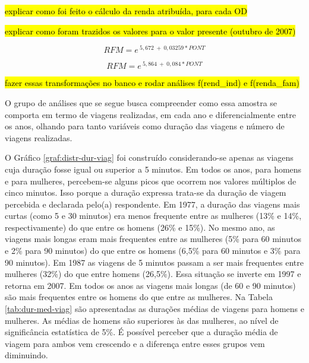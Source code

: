 \hl{explicar como foi feito o cálculo da renda atribuída, para cada OD}

\hl{explicar como foram trazidos os valores para o valor presente (outubro de 2007)}

\begin{equation}\label{eq:reg-renda-1997}
RFM = e^{~5,672~+~0,03259*PONT}
\end{equation}

\begin{equation}\label{eq:reg-renda-2007}
RFM = e^{~5,864~+~0,084*PONT}
\end{equation}

\hl{fazer essas transformações no banco e rodar análises f(rend\_ind) e f(renda\_fam)}

\clearpage
O grupo de análises que se segue busca compreender como essa amostra se comporta em termo de viagens realizadas, em cada ano e diferencialmente entre os anos, olhando para tanto variáveis como duração das viagens e número de viagens realizadas.


O Gráfico \ref{graf:distr-dur-viag} foi construído considerando-se apenas as viagens cuja duração fosse igual ou superior a 5 minutos. Em todos os anos, para homens e para mulheres, percebem-se alguns picos que ocorrem nos valores múltiplos de cinco minutos. Isso porque a duração expressa trata-se da duração de viagem percebida e declarada pelo(a) respondente. Em 1977, a duração das viagens mais curtas (como 5 e 30 minutos) era menos frequente entre as mulheres (13\% e 14\%, respectivamente) do que entre os homens (26\% e 15\%). No mesmo ano, as viagens mais longas eram mais frequentes entre as mulheres (5\% para 60 minutos e 2\% para 90 minutos) do que entre os homens (6,5\% para 60 minutos e 3\% para 90 minutos). Em 1987 as viagens de 5 minutos passam a ser mais frequentes entre mulheres (32\%) do que entre homens (26,5\%). Essa situação se inverte em 1997 e retorna em 2007.
Em todos os anos as viagens mais longas (de 60 e 90 minutos) são mais frequentes entre os homens do que entre as mulheres.
Na Tabela \ref{tab:dur-med-viag} são apresentadas as durações médias de viagens para homens e mulheres. As médias de homens são superiores às das mulheres, ao nível de significância estatística de 5\%. É possível perceber que a duração média de viagem para ambos vem crescendo e a diferença entre esses grupos vem diminuindo.

